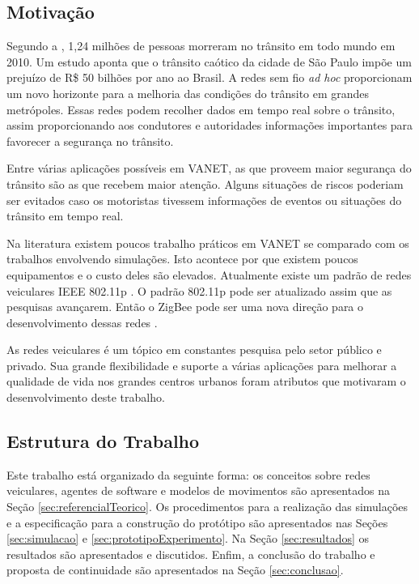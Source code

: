 \subsection{Motivação}

Segundo a \cite{oms:2013}, 1,24 milhões de pessoas morreram no trânsito em todo mundo em 2010. Um estudo \cite{Cintra:2012} aponta que o trânsito caótico da cidade de São Paulo impõe um prejuízo de R\$ 50 bilhões por ano ao Brasil. A redes sem fio \emph{ad hoc} proporcionam um novo horizonte para a melhoria das condições do trânsito em grandes metrópoles. Essas redes podem recolher dados em tempo real sobre o trânsito, assim proporcionando aos condutores e autoridades informações importantes para favorecer a segurança no trânsito.  	

Entre várias aplicações possíveis em VANET, as que proveem maior segurança do trânsito são as que recebem maior atenção. Alguns situações de riscos poderiam ser evitados caso os motoristas tivessem informações de eventos ou situações do trânsito em tempo real.

Na literatura existem poucos trabalho práticos em VANET se comparado com os trabalhos envolvendo simulações. Isto acontece por que existem poucos equipamentos e o custo deles são elevados. Atualmente existe um padrão de redes veiculares IEEE 802.11p \cite{Jiang:2008}. O padrão 802.11p pode ser atualizado assim que as pesquisas avançarem. Então o ZigBee pode ser uma nova direção para o desenvolvimento dessas redes \cite{Bhargav:2013}. 

As redes veiculares é um tópico em constantes pesquisa pelo setor público e privado. Sua grande flexibilidade e suporte a várias aplicações para melhorar a qualidade de vida nos grandes centros urbanos foram atributos que motivaram o desenvolvimento deste trabalho.

\subsection{Estrutura do Trabalho}

Este trabalho está organizado da seguinte forma: os conceitos sobre redes veiculares, agentes de software e modelos de movimentos são apresentados na Seção \ref{sec:referencialTeorico}. Os procedimentos para a realização das simulações e a especificação para a construção do protótipo são apresentados nas Seções \ref{sec:simulacao} e \ref{sec:prototipoExperimento}. Na Seção \ref{sec:resultados} os resultados são apresentados e discutidos. Enfim, a conclusão do trabalho e proposta de continuidade são apresentados na Seção \ref{sec:conclusao}.
